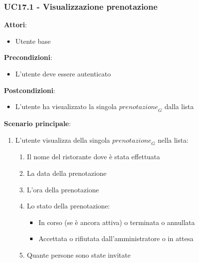 \subsubsection{UC17.1 - Visualizzazione prenotazione}\label{usecase:17_1}
\textbf{Attori}:
\begin{itemize}
    \item Utente base
\end{itemize}
\textbf{Precondizioni}:
\begin{itemize}
    \item L'utente deve essere autenticato
\end{itemize}
\textbf{Postcondizioni}:
\begin{itemize}
    \item L'utente ha visualizzato la singola $\textit{prenotazione}_G$ dalla lista
\end{itemize}
\textbf{Scenario principale}:
\begin{enumerate}
    \item L'utente visualizza della singola $\textit{prenotazione}_G$ nella lista:
    \begin{enumerate}
        \item Il nome del ristorante dove è stata effettuata
        \item La data della prenotazione
        \item L'ora della prenotazione
        \item Lo stato della prenotazione:
            \begin{itemize}
                \item In corso (se è ancora attiva) o terminata  o annullata
                \item Accettata o rifiutata dall'amministratore o in attesa
        \end{itemize}
        \item Quante persone sono state invitate
    \end{enumerate}
\end{enumerate}
\newpage